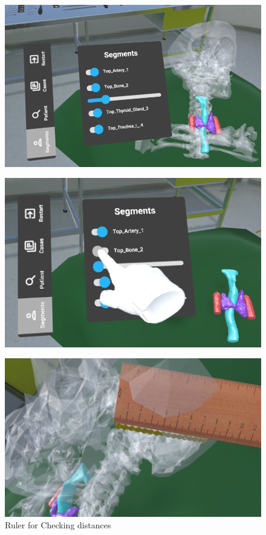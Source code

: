 \begin{figure}
    \centering
    \begin{minipage}{.5\textwidth}
      \centering
      \includegraphics[width=0.95\linewidth]{images/implementation/features/visualization/segments_1.png}
      \label{fig:test1}
    \end{minipage}%
    \begin{minipage}{.5\textwidth}
      \centering
      \includegraphics[width=0.95\linewidth]{images/implementation/features/visualization/segments_2.png}
      \label{fig:test2}
    \end{minipage}
    \end{figure}

\begin{figure}[ht!]
    \centering
    \includegraphics[width=\linewidth]{images/implementation/features/visualization/ruler.png}
    \caption{\label{fig::FeatureRuler} Ruler for Checking distances}
\end{figure}

